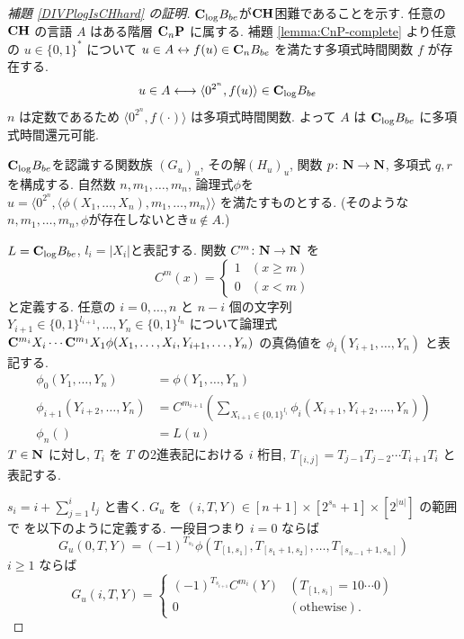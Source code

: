 \begin{proof}[\rm 補題 \ref{DIVPlogIsCHhard} の証明]
 $\mathbf{C}_{\log} B_{be}$が$\mathbf{CH}$困難であることを示す.
 任意の $\mathbf{CH}$ の言語 $A$ はある階層 $\mathbf{C}_n \mathbf{P}$ に属する. 
 補題 \ref{lemma:CnP-complete} より任意の $u \in \{0,1\}^*$ について
 $u \in A \leftrightarrow f(u) \in \mathbf{C}_n B_{be}$ 
 を満たす多項式時間関数 $f$ が存在する.
 \begin{align}
  u \in A 
  & \longleftrightarrow \langle 0^{2^n}, f(u) \rangle \in \mathbf{C}_{\log} B_{be}
 \end{align}
 $n$ は定数であるため $\langle 0^{2^n}, f(\cdot) \rangle$ は多項式時間関数.
 よって $A$ は $\mathbf{C}_{\log} B_{be}$ に多項式時間還元可能.


 $\mathbf{C}_{\log} B_{be}$を認識する関数族 $(G_u)_u$, 
 その解$(H_u)_u$, 関数 $p \colon \mathbf N \to \mathbf N$, 多項式 $q,r$ を構成する.
 自然数 $n, m_1, \dots, m_n$, 論理式$\phi$を
 $u  = \langle 0^{2^n}, 
 \langle \phi(X_1, \dots, X_n), m_1, \dots, m_n \rangle \rangle$
 を満たすものとする. 
 (そのような$n, m_1, \dots, m_n, \phi$が存在しないとき$u \not \in A$.)
 
 
 $L = \mathbf{C}_{\log} B_{be}$, $l_i = |X_i|$と表記する.
 関数 $C^m \colon \mathbf N \to \mathbf N$ を
 \begin{equation}
  C^m(x) 
     = \begin{cases}
       1 & (x \ge m) \\
       0 & (x < m) \end{cases}
 \end{equation}
 と定義する. 
 任意の $i = 0, \dots, n$ と $n-i$ 個の文字列 
 $Y_{i+1} \in \{0,1\}^{l_{i+1}}, \dots, Y_n \in \{0,1\}^{l_n}$ 
 について論理式
 $\mathbf{C}^{m_{i}}{X_i} \cdots \mathbf{C}^{m_1}{X_1}
 \phi(X_1, \dots, X_i, Y_{i+1}, \dots, Y_n)$
 の真偽値を $\phi_i(Y_{i+1}, \dots, Y_n)$ と表記する.
 \begin{align}
  \phi_0 (Y_1, \dots, Y_n) &= \phi(Y_1, \dots, Y_n)
  \\ \label{eq:phi-step}
  \phi_{i+1}(Y_{i+2}, \dots, Y_n) 
  &= C^{m_{i+1}}\left(\sum\nolimits_{X_{i+1} \in \{0,1\}^{l_i}} 
  \phi_i(X_{i+1}, Y_{i+2}, \dots, Y_{n})\right) 
  \\
  \phi_n() &= L(u) 
 \end{align}
 $T \in \mathbf N$ に対し, $T_i$ を $T$ の2進表記における $i$ 桁目, 
 $T_{[i,j]} = T_{j-1} T_{j-2} \cdots T_{i+1} T_{i}$ と表記する.


 $s_i = i + \sum^i_{j=1}l_j$ と書く.
 $G_u$ を $(i, T, Y) \in [n+1] \times [2^{s_n}+1] \times [2^{|u|}]$ の範囲で
 を以下のように定義する. 一段目つまり $i=0$ ならば
 \begin{equation}
  G_u(0,T,Y) = 
   (-1)^{T_{s_1}}\phi(T_{[1,s_1]}, T_{[s_1+1,s_2]},
    \dots, T_{[s_{n-1}+1,s_n]}) 
 \end{equation}
 $i \ge 1$ ならば
 \begin{equation} \label{eq:def-Gu:case0}
  G_u(i,T,Y) = 
   \begin{cases}
    (-1)^{T_{s_{i+1}}} C^{m_i}(Y) 
    & (T_{[1,s_i]} = 10 \cdots 0) \\
    0 & (\text{othewise}).
   \end{cases} 
 \end{equation}



\end{proof}

